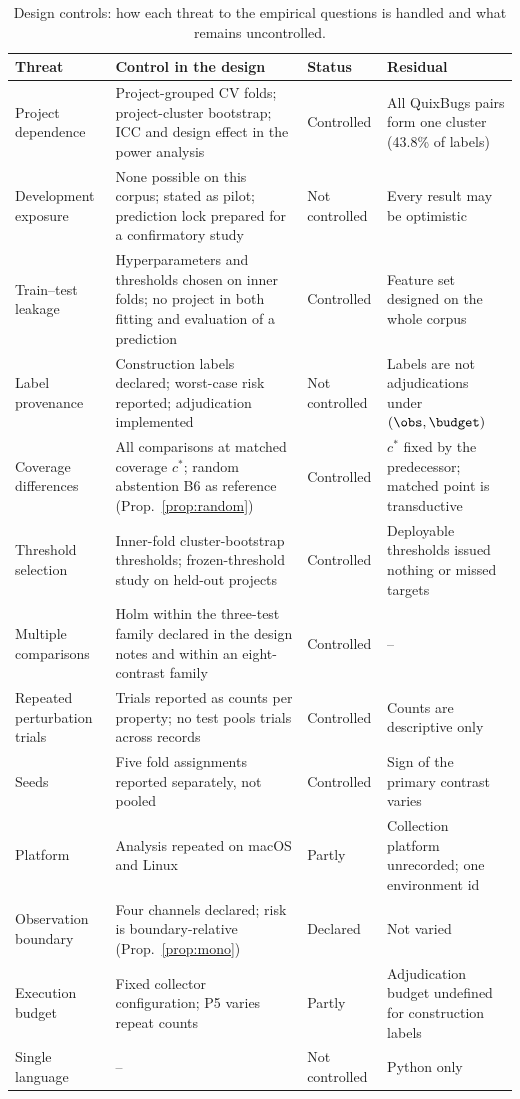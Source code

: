 \begin{table}[!t]
\caption{Design controls: how each threat to the empirical questions is handled and what remains uncontrolled.}
\label{tab:controls}
\centering
\scriptsize
\setlength{\tabcolsep}{3pt}
\renewcommand{\arraystretch}{1.08}
\begin{tabular}{|L{2.6cm}|L{6.4cm}|L{1.7cm}|L{4.9cm}|}
\hline
Threat & Control in the design & Status & Residual \\
\hline
Project dependence & Project-grouped CV folds; project-cluster bootstrap; ICC and design effect in the power analysis & Controlled & All QuixBugs pairs form one cluster (43.8\% of labels) \\
Development exposure & None possible on this corpus; stated as pilot; prediction lock prepared for a confirmatory study & Not controlled & Every result may be optimistic \\
Train--test leakage & Hyperparameters and thresholds chosen on inner folds; no project in both fitting and evaluation of a prediction & Controlled & Feature set designed on the whole corpus \\
Label provenance & Construction labels declared; worst-case risk reported; adjudication implemented & Not controlled & Labels are not adjudications under $(\obs,\budget)$ \\
Coverage differences & All comparisons at matched coverage $c^\ast$; random abstention B6 as reference (Prop.~\ref{prop:random}) & Controlled & $c^\ast$ fixed by the predecessor; matched point is transductive \\
Threshold selection & Inner-fold cluster-bootstrap thresholds; frozen-threshold study on held-out projects & Controlled & Deployable thresholds issued nothing or missed targets \\
Multiple comparisons & Holm within the three-test family declared in the design notes and within an eight-contrast family & Controlled & -- \\
Repeated perturbation trials & Trials reported as counts per property; no test pools trials across records & Controlled & Counts are descriptive only \\
Seeds & Five fold assignments reported separately, not pooled & Controlled & Sign of the primary contrast varies \\
Platform & Analysis repeated on macOS and Linux & Partly & Collection platform unrecorded; one environment id \\
Observation boundary & Four channels declared; risk is boundary-relative (Prop.~\ref{prop:mono}) & Declared & Not varied \\
Execution budget & Fixed collector configuration; P5 varies repeat counts & Partly & Adjudication budget undefined for construction labels \\
Single language & -- & Not controlled & Python only \\
\hline
\end{tabular}
\end{table}


